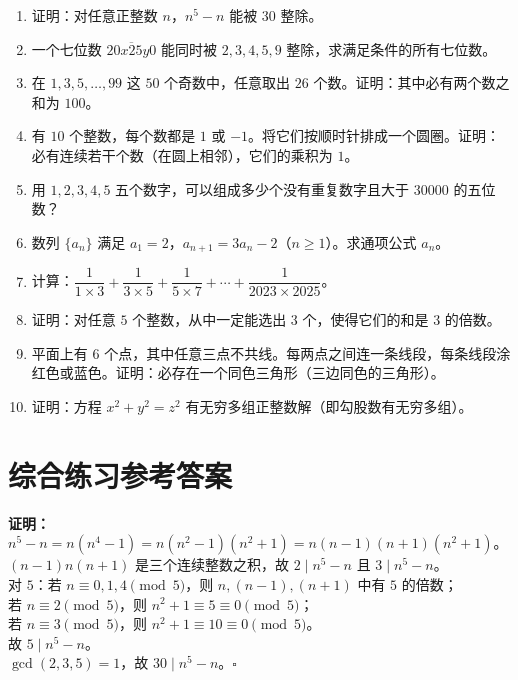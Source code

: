 \documentclass[12pt, a4paper]{ctexart}
\begin{document}
\begin{enumerate}[label=\textbf{\arabic*.}, itemsep=8pt]

  \item 证明：对任意正整数 $n$，$n^5-n$ 能被 $30$ 整除。

  \item 一个七位数 $\overline{20x25y0}$ 能同时被 $2,3,4,5,9$ 整除，求满足条件的所有七位数。

  \item 在 $1,3,5,\ldots,99$ 这 $50$ 个奇数中，任意取出 $26$ 个数。证明：其中必有两个数之和为 $100$。

  \item 有 $10$ 个整数，每个数都是 $1$ 或 $-1$。将它们按顺时针排成一个圆圈。证明：必有连续若干个数（在圆上相邻），它们的乘积为 $1$。

  \item 用 $1,2,3,4,5$ 五个数字，可以组成多少个没有重复数字且大于 $30000$ 的五位数？

  \item 数列 $\{a_n\}$ 满足 $a_1=2$，$a_{n+1}=3a_n-2$（$n\geqslant 1$）。求通项公式 $a_n$。

  \item 计算：$\dfrac{1}{1\times 3}+\dfrac{1}{3\times 5}+\dfrac{1}{5\times 7}+\cdots+\dfrac{1}{2023\times 2025}$。

  \item 证明：对任意 $5$ 个整数，从中一定能选出 $3$ 个，使得它们的和是 $3$ 的倍数。

  \item 平面上有 $6$ 个点，其中任意三点不共线。每两点之间连一条线段，每条线段涂红色或蓝色。证明：必存在一个同色三角形（三边同色的三角形）。

  \item 证明：方程 $x^2+y^2=z^2$ 有无穷多组正整数解（即勾股数有无穷多组）。

\end{enumerate}

\newpage
\section*{\textcolor{mainblue}{综合练习参考答案}}

\begin{knowledgebox}[第1题]
\textbf{证明：}$n^5-n=n(n^4-1)=n(n^2-1)(n^2+1)=n(n-1)(n+1)(n^2+1)$。\\[4pt]
$(n-1)n(n+1)$ 是三个连续整数之积，故 $2\mid n^5-n$ 且 $3\mid n^5-n$。\\[4pt]
对 $5$：若 $n\equiv 0,1,4\pmod{5}$，则 $n,(n-1),(n+1)$ 中有 $5$ 的倍数；\\
若 $n\equiv 2\pmod{5}$，则 $n^2+1\equiv 5\equiv 0\pmod{5}$；\\
若 $n\equiv 3\pmod{5}$，则 $n^2+1\equiv 10\equiv 0\pmod{5}$。\\
故 $5\mid n^5-n$。\\[4pt]
$\gcd(2,3,5)=1$，故 $30\mid n^5-n$。\hfill$\square$
\end{knowledgebox}
\end{document}
